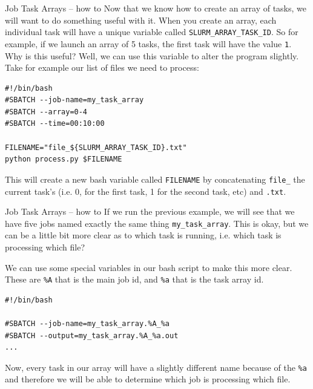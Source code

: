 \documentclass[10pt]{beamer}
\begin{document}
\begin{frame}[label={sec:orge2d664b},fragile]{Job Task Arrays -- how to}
 Now that we know how to create an array of tasks, we will want to do something
useful with it. When you create an array, each individual task will have a
unique variable called \texttt{SLURM\_ARRAY\_TASK\_ID}. So for example, if we launch an
array of 5 tasks, the first task will have the value \texttt{1}. Why is this useful?
Well, we can use this variable to alter the program slightly. Take for example
our list of files we need to process:

\begin{verbatim}
#!/bin/bash
#SBATCH --job-name=my_task_array
#SBATCH --array=0-4
#SBATCH --time=00:10:00

FILENAME="file_${SLURM_ARRAY_TASK_ID}.txt"
python process.py $FILENAME
\end{verbatim}

This will create a new bash variable called \texttt{FILENAME} by concatenating \texttt{file\_} the
current task's (i.e. 0, for the first task, 1 for the second task, etc) and
\texttt{.txt}.
\end{frame}

\begin{frame}[label={sec:org19127cc},fragile]{Job Task Arrays -- how to}
 If we run the previous example, we will see that we have five jobs named exactly
the same thing \texttt{my\_task\_array}. This is okay, but we can be a little bit more
clear as to which task is running, i.e. which task is processing which file?

We can use some special variables in our bash script to make this more
clear. These are \texttt{\%A} that is the main job id, and \texttt{\%a} that is the task array id.

\begin{verbatim}
#!/bin/bash

#SBATCH --job-name=my_task_array.%A_%a
#SBATCH --output=my_task_array.%A_%a.out
...
\end{verbatim}

Now, every task in our array will have a slightly different name because of the
\texttt{\%a} and therefore we will be able to determine which job is processing which
file.
\end{frame}
\end{document}
